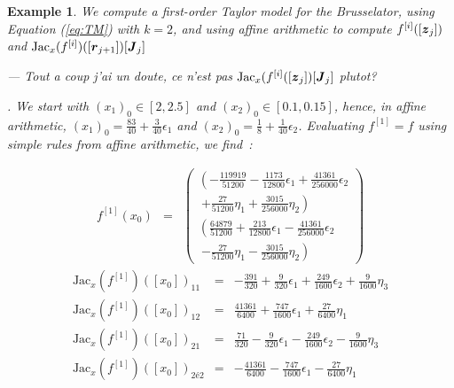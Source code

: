 \documentclass{sig-alternate-05-2015} %
\newcommand\ForAuthors[1]%
 {\par\smallskip                     %
  \begin{center}%
   \fbox%
   {\parbox{0.9\linewidth}%
    {\raggedright\sc--- #1}%
   }%
  \end{center}%
  \par\smallskip                     %
 }
\newtheorem{example}{Example}
\begin{document}
\begin{example}
\label{running3}
We compute a first-order Taylor model for the Brusselator, using Equation
(\ref{eq:TM}) with $k=2$, and using affine arithmetic to compute $f^{[i]}([{\z}_j])$
and $\mbox{Jac}_x(f^{[i]})([\r_{j+1}])[\J_j]$ 
\ForAuthors{Tout a coup j'ai un doute, ce n'est pas 
$\mbox{Jac}_x(f^{[i]}([\z_j])[\J_j]$ plutot?}. We start with 
$(x_1)_0\in [2,2.5]$ and $(x_2)_0 \in [0.1,0.15]$, hence, in affine arithmetic,
$(x_1)_0 = \frac{83}{40}+\frac{3}{40}\epsilon_1$ and 
$(x_2)_0 = \frac{1}{8}+\frac{1}{40}\epsilon_2$. Evaluating $f^{[1]}=f$ using
simple rules from affine arithmetic, we find~: 

\begin{eqnarray}%
f^{[1]}(x_0) & = & \left(\begin{array}{c}
\left(-\frac{119919}{51200}-\frac{1173}{12800} \epsilon_1+\frac{41361}{256000}\epsilon_2
\right.
\\
\ \left.+\frac{27}{51200}\eta_1+\frac{3015}{256000}\eta_2\right) \\ 
\left(\frac{64879}{51200}+\frac{213}{12800}\epsilon_1-\frac{41361}{256000}\epsilon_2
\right.\\
\ \left. -\frac{27}{51200}\eta_1
-\frac{3015}{256000}\eta_2 \right) 
\end{array}\right)
\end{eqnarray}
\begin{eqnarray}
\mbox{Jac}_x(f^{[1]})([x_0])_{11} & = & -\frac{391}{320}+\frac{9}{320}\epsilon_1+\frac{249}{1600}\epsilon_2+\frac{9}{1600}\eta_3\\
\mbox{Jac}_x(f^{[1]})([x_0])_{12} & = & \frac{41361}{6400}+\frac{747}{1600}\epsilon_1+\frac{27}{6400}\eta_1\\
\mbox{Jac}_x(f^{[1]})([x_0])_{21} & = & \frac{71}{320}-\frac{9}{320}\epsilon_1-\frac{249}{1600}\epsilon_2-\frac{9}{1600}\eta_3\\
\mbox{Jac}_x(f^{[1]})([x_0])_{2é2} & = & -\frac{41361}{6400}-\frac{747}{1600}\epsilon_1-\frac{27}{6400}\eta_1
\label{firstderivative}
\end{eqnarray}
\end{example}

\end{document}
